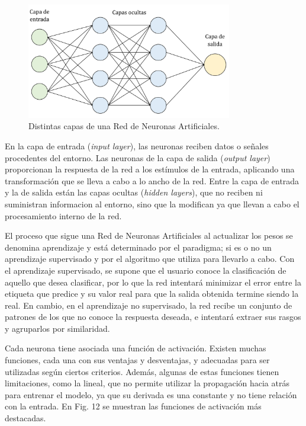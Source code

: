 \documentclass[spanish,a4paper,12pt,twoside]{report}
\begin{document}
    \begin{figure}[H]
      \centering
      \includegraphics[width = 0.8\textwidth]{resources/Fig11.pdf}
      \caption{Distintas capas de una Red de Neuronas Artificiales.}
      \label{fig:11}
    \end{figure} \par
    En la capa de entrada (\emph{input layer}), las neuronas reciben datos o señales procedentes del entorno. Las neuronas de la capa de salida (\emph{output layer}) proporcionan la respuesta de la red a los estímulos de la entrada, aplicando una transformación que se lleva a cabo a lo ancho de la red. Entre la capa de entrada y la de salida están las capas ocultas (\emph{hidden layers}), que no reciben ni suministran informacion al entorno, sino que la modifican ya que llevan a cabo el procesamiento interno de la red. \par
    El proceso que sigue una Red de Neuronas Artificiales al actualizar los pesos se denomina aprendizaje y está determinado por el paradigma; si es o no un aprendizaje supervisado y por el algoritmo que utiliza para llevarlo a cabo. Con el aprendizaje supervisado, se supone que el usuario conoce la clasificación de aquello que desea clasificar, por lo que la red intentará minimizar el error entre la etiqueta que predice y su valor real para que la salida obtenida termine siendo la real. En cambio, en el aprendizaje no supervisado, la red recibe un conjunto de patrones de los que no conoce la respuesta deseada, e intentará extraer sus rasgos y agruparlos por similaridad. \par
    Cada neurona tiene asociada una función de activación. Existen muchas funciones, cada una con sus ventajas y desventajas, y adecuadas para ser utilizadas según ciertos criterios. Además, algunas de estas funciones tienen limitaciones, como la lineal, que no permite utilizar la propagación hacia atrás para entrenar el modelo, ya que su derivada es una constante y no tiene relación con la entrada. En Fig. 12 se muestran las funciones de activación más destacadas.
    
\end{document}

